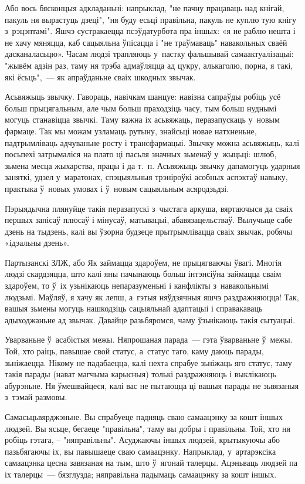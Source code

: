 Або вось бясконцыя адкладаньні: напрыклад, "не пачну працаваць над кнігай, пакуль ня вырастуць дзеці", "ня буду есьці правільна, пакуль не куплю тую кнігу з~рэцэптамі". Яшчэ сустракаецца псэўдатурбота пра іншых: «я не раблю нешта і не хачу мяняцца, каб сацыяльна ўпісацца і "не траўмаваць" навакольных сваёй дасканаласьцю». Часам людзі трапляюць у~пастку фальшывай самаактуалізацыі: "жывём адзін раз, таму ня трэба адмаўляцца ад цукру, алькаголю, порна, я такі, які ёсьць",~--- як апраўданьне сваіх шкодных звычак.

Асьвяжыць звычку. Гавораць, навічкам шанцуе: навізна сапраўды робіць усё больш прыцягальным, але чым больш праходзіць часу, тым больш нуднымі могуць станавіцца звычкі. Таму важна іх асьвяжаць, перазапускаць у~новым фармаце. Так мы можам узламаць рутыну, знайсьці новае натхненьне, падтрымліваць адчуваньне росту і трансфармацыі. Звычку можна асьвяжыць, калі посьпехі затрымаліся на плато ці пасьля значных зьменаў у~жыцьці: шлюб, зьмена месца жыхарства, працы і да т.~п. Асьвяжыць звычку дапамогуць ударныя заняткі, удзел у~маратонах, спэцыяльныя трэніроўкі асобных аспэктаў навыку, практыка ў~новых умовах і ў~новым сацыяльным асяродзьдзі.

Пэрыядычна плянуйце такія перазапускі з~чыстага аркуша, вяртаючыся да сваіх першых запісаў плюсаў і мінусаў, матывацыі, абавязацельстваў. Вылучыце сабе дзень на тыдзень, калі вы ўзорна будзеце прытрымлівацца сваіх звычак, робячы «ідэальны дзень».

Партызанскі ЗЛЖ, або Як займацца здароўем, не прыцягваючы ўвагі. Многія людзі скардзяцца, што калі яны пачынаюць больш інтэнсіўна займацца сваім здароўем, то ў~іх узьнікаюць непаразуменьні і канфлікты з~навакольнымі людзьмі. Маўляў, я хачу як лепш, а~гэтыя няўдзячныя яшчэ раздражняюцца! Так, вашыя зьмены могуць нашкодзіць сацыяльнай адаптацыі і справакаваць адыходжаньне ад звычак. Давайце разьбяромся, чаму ўзьнікаюць такія сытуацыі.

Уварваньне ў~асабістыя межы. Няпрошаная парада~--- гэта ўварваньне ў~межы. Той, хто раіць, павышае свой статус, а~статус таго, каму даюць парады, зьніжаецца. Нікому не падабаецца, калі нехта спрабуе зьніжаць яго статус, таму такія парады (нават магчыма карысныя) толькі раздражняюць і выклікаюць абурэньне. Ня ўмешвайцеся, калі вас не пытаюцца ці вашыя парады не зьвязаныя з~тэмай размовы.

Самасьцьвярджэньне. Вы спрабуеце падняць сваю самаацэнку за кошт іншых людзей. Вы ясьце, бегаеце "правільна", таму вы добры і правільны. Той, хто ня робіць гэтага, -- "няправільны". Асуджаючы іншых людзей, крытыкуючы або пазьбягаючы іх, вы павышаеце сваю самаацэнку. Напрыклад, у~артарэксіка самаацэнка цесна завязаная на тым, што ў~ягонай талерцы. Ацэньваць людзей па іх талерцы~--- бязглузда; няправільна падымаць самаацэнку за кошт іншых.

